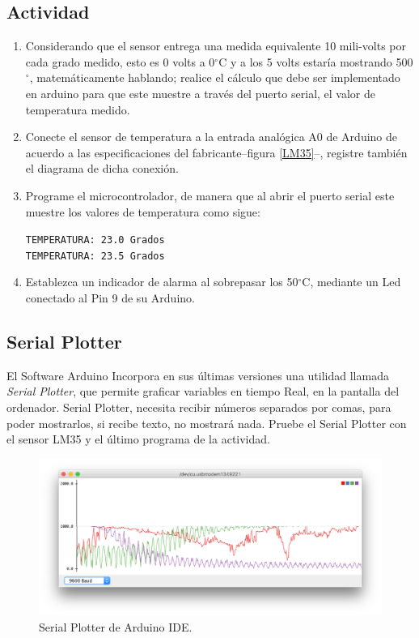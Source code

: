 \documentclass[letterpaper, 10pt]{report}
\begin{document}
\subsection{Actividad}
\begin{enumerate}
\item Considerando que el sensor entrega una medida equivalente  10 mili-volts por cada grado medido, esto es 0 volts a 0$^\circ$C y a los 5 volts estaría mostrando 500$^\circ$, matemáticamente hablando; realice el cálculo que debe ser implementado en arduino para que este muestre a través del puerto serial, el valor de temperatura medido.

\item Conecte el sensor de temperatura a la entrada analógica A0 de Arduino de acuerdo a las especificaciones del fabricante--figura \ref{LM35}--, registre también el diagrama de dicha conexión.

\item Programe el microcontrolador, de manera que al abrir el puerto serial este muestre los valores de temperatura como sigue:
\begin{center}
	\texttt{TEMPERATURA: 23.0 Grados}\\
	\texttt{TEMPERATURA: 23.5 Grados}
\end{center}

\item Establezca un indicador de alarma al sobrepasar los 50$^\circ$C, mediante un Led conectado al Pin 9 de su Arduino.
\end{enumerate}

\subsection{Serial Plotter}

El Software Arduino Incorpora en sus últimas versiones una utilidad llamada \emph{Serial Plotter}, que permite graficar variables en tiempo Real, en la pantalla del ordenador. Serial Plotter, necesita recibir números separados por comas, para poder mostrarlos, si recibe texto, no mostrará nada.
Pruebe el Serial Plotter con el sensor LM35 y el último programa de la actividad.

\begin{figure}[h]
\centering
\includegraphics[scale=0.4]{serialPlotter.png}
\caption{Serial Plotter de Arduino IDE.}
\end{figure}
\end{document}
